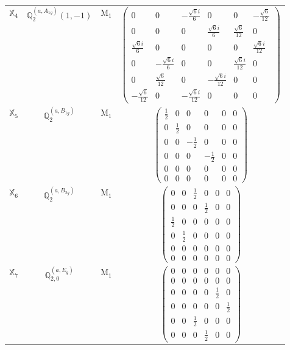 \documentclass[fleqn,10pt,landscape]{article}
\begin{document}
\begin{itemize}
\begin{center}
\begin{longtable}{c|c|c|c}
$ \mathbb{X}_{4} $ & $\mathbb{Q}_{2}^{(a,A_{1g})}(1,-1)$ & M$_{1}$ & $\begin{pmatrix} 0 & 0 & - \frac{\sqrt{6} i}{6} & 0 & 0 & - \frac{\sqrt{6}}{12} \\ 0 & 0 & 0 & \frac{\sqrt{6} i}{6} & \frac{\sqrt{6}}{12} & 0 \\ \frac{\sqrt{6} i}{6} & 0 & 0 & 0 & 0 & \frac{\sqrt{6} i}{12} \\ 0 & - \frac{\sqrt{6} i}{6} & 0 & 0 & \frac{\sqrt{6} i}{12} & 0 \\ 0 & \frac{\sqrt{6}}{12} & 0 & - \frac{\sqrt{6} i}{12} & 0 & 0 \\ - \frac{\sqrt{6}}{12} & 0 & - \frac{\sqrt{6} i}{12} & 0 & 0 & 0 \end{pmatrix}$ \\
$ \mathbb{X}_{5} $ & $\mathbb{Q}_{2}^{(a,B_{1g})}$ & M$_{1}$ & $\begin{pmatrix} \frac{1}{2} & 0 & 0 & 0 & 0 & 0 \\ 0 & \frac{1}{2} & 0 & 0 & 0 & 0 \\ 0 & 0 & - \frac{1}{2} & 0 & 0 & 0 \\ 0 & 0 & 0 & - \frac{1}{2} & 0 & 0 \\ 0 & 0 & 0 & 0 & 0 & 0 \\ 0 & 0 & 0 & 0 & 0 & 0 \end{pmatrix}$ \\
$ \mathbb{X}_{6} $ & $\mathbb{Q}_{2}^{(a,B_{2g})}$ & M$_{1}$ & $\begin{pmatrix} 0 & 0 & \frac{1}{2} & 0 & 0 & 0 \\ 0 & 0 & 0 & \frac{1}{2} & 0 & 0 \\ \frac{1}{2} & 0 & 0 & 0 & 0 & 0 \\ 0 & \frac{1}{2} & 0 & 0 & 0 & 0 \\ 0 & 0 & 0 & 0 & 0 & 0 \\ 0 & 0 & 0 & 0 & 0 & 0 \end{pmatrix}$ \\
$ \mathbb{X}_{7} $ & $\mathbb{Q}_{2,0}^{(a,E_{g})}$ & M$_{1}$ & $\begin{pmatrix} 0 & 0 & 0 & 0 & 0 & 0 \\ 0 & 0 & 0 & 0 & 0 & 0 \\ 0 & 0 & 0 & 0 & \frac{1}{2} & 0 \\ 0 & 0 & 0 & 0 & 0 & \frac{1}{2} \\ 0 & 0 & \frac{1}{2} & 0 & 0 & 0 \\ 0 & 0 & 0 & \frac{1}{2} & 0 & 0 \end{pmatrix}$ \\

\end{longtable}
\end{center}
\end{itemize}
\end{document}
